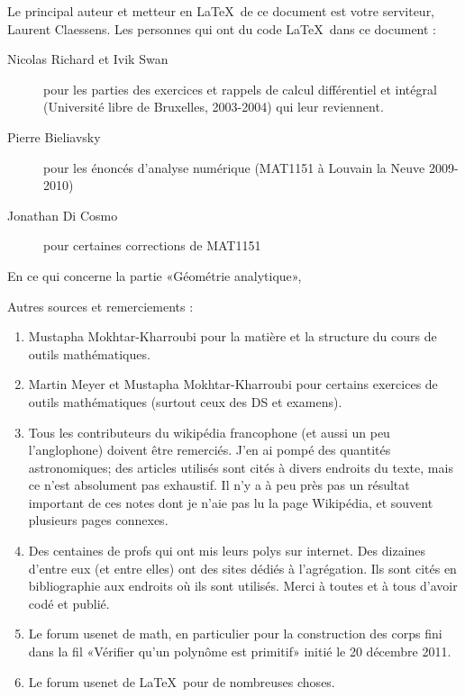 Le principal auteur et metteur en \LaTeX\ de ce document est votre serviteur, Laurent Claessens. Les personnes qui ont du code \LaTeX\ dans ce document :
\begin{description}
    \item[Nicolas Richard et Ivik Swan] pour les parties des exercices et rappels de calcul différentiel et intégral (Université libre de Bruxelles, 2003-2004) qui leur reviennent.
    \item[Pierre Bieliavsky] pour les énoncés d'analyse numérique (MAT1151 à Louvain la Neuve 2009-2010)
    \item[Jonathan Di Cosmo] pour certaines corrections de MAT1151
\end{description}

En ce qui concerne la partie «Géométrie analytique», 


Autres sources et remerciements :
\begin{enumerate}
    \item
        Mustapha Mokhtar-Kharroubi pour la matière et la structure du cours de outils mathématiques.
    \item
        Martin Meyer et Mustapha Mokhtar-Kharroubi pour certains exercices de outils mathématiques (surtout ceux des DS et examens).
    \item
        Tous les contributeurs du wikipédia francophone (et aussi un peu l'anglophone) doivent être remerciés. J'en ai pompé des quantités astronomiques; des articles utilisés sont cités à divers endroits du texte, mais ce n'est absolument pas exhaustif. Il n'y a à peu près pas un résultat important de ces notes dont je n'aie pas lu la page Wikipédia, et souvent plusieurs pages connexes.
    \item
        Des centaines de profs qui ont mis leurs polys sur internet. Des dizaines d'entre eux (et entre elles) ont des sites dédiés à l'agrégation. Ils sont cités en bibliographie aux endroits où ils sont utilisés. Merci à toutes et à tous d'avoir codé et publié.

    \item
        Le forum usenet de math, en particulier pour la construction des corps fini dans la fil «Vérifier qu'un polynôme est primitif» initié le 20 décembre 2011.
    \item
        Le forum usenet de \LaTeX\ pour de nombreuses choses.
\end{enumerate}




